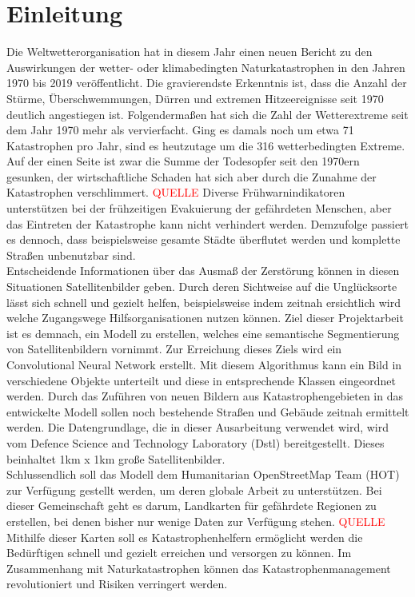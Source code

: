 \section{Einleitung}

Die Weltwetterorganisation hat in diesem Jahr einen neuen Bericht zu den Auswirkungen der
wetter- oder klimabedingten Naturkatastrophen in den Jahren 1970 bis 2019 veröffentlicht.
Die gravierendste Erkenntnis ist, dass die Anzahl der Stürme, Überschwemmungen, Dürren und
extremen Hitzeereignisse seit 1970 deutlich angestiegen ist.
Folgendermaßen hat sich die Zahl der Wetterextreme seit dem Jahr 1970 mehr als vervierfacht.
Ging es damals noch um etwa 71 Katastrophen pro Jahr, sind es heutzutage um die 316
wetterbedingten Extreme.
Auf der einen Seite ist zwar die Summe der Todesopfer seit den 1970ern gesunken,
der wirtschaftliche Schaden hat sich aber durch die Zunahme der Katastrophen verschlimmert.
	{\textcolor{red}{QUELLE}}
Diverse Frühwarnindikatoren unterstützen bei der frühzeitigen Evakuierung der gefährdeten
Menschen, aber das Eintreten der Katastrophe kann nicht verhindert werden.
Demzufolge passiert es dennoch, dass beispielsweise gesamte Städte überflutet werden und
komplette Straßen unbenutzbar sind. \\
Entscheidende Informationen über das Ausmaß der Zerstörung können in diesen Situationen
Satellitenbilder geben.
Durch deren Sichtweise auf die Unglücksorte lässt sich schnell und gezielt helfen,
beispielsweise indem zeitnah ersichtlich wird welche Zugangswege Hilfsorganisationen nutzen können.
Ziel dieser Projektarbeit ist es demnach, ein Modell zu erstellen,
welches eine semantische Segmentierung von Satellitenbildern vornimmt.
Zur Erreichung dieses Ziels wird ein Convolutional Neural Network erstellt.
Mit diesem Algorithmus kann ein Bild in verschiedene Objekte unterteilt und diese in entsprechende
Klassen eingeordnet werden.
Durch das Zuführen von neuen Bildern aus Katastrophengebieten in das entwickelte Modell sollen noch bestehende
Straßen und Gebäude zeitnah ermittelt werden.
Die Datengrundlage, die in dieser Ausarbeitung verwendet wird, wird vom
Defence Science and Technology Laboratory (Dstl) bereitgestellt.
Dieses beinhaltet 1km x 1km große Satellitenbilder. \\
Schlussendlich soll das Modell dem Humanitarian OpenStreetMap Team (HOT) zur Verfügung gestellt werden,
um deren globale Arbeit zu unterstützen.
Bei dieser Gemeinschaft geht es darum, Landkarten für gefährdete Regionen zu erstellen,
bei denen bisher nur wenige Daten zur Verfügung stehen. {\textcolor{red}{QUELLE}}
Mithilfe dieser Karten soll es Katastrophenhelfern ermöglicht werden die Bedürftigen schnell und gezielt
erreichen und versorgen zu können.
Im Zusammenhang mit Naturkatastrophen können das Katastrophenmanagement revolutioniert und Risiken verringert werden.


